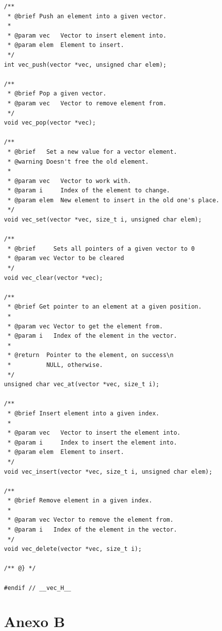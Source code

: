 \documentclass[11pt]{report}
\begin{document}
\begin{lstlisting}
/**
 * @brief Push an element into a given vector.
 *
 * @param vec   Vector to insert element into.
 * @param elem  Element to insert.
 */
int vec_push(vector *vec, unsigned char elem);

/**
 * @brief Pop a given vector.
 * @param vec   Vector to remove element from.
 */
void vec_pop(vector *vec);

/**
 * @brief   Set a new value for a vector element.
 * @warning Doesn't free the old element.
 *
 * @param vec   Vector to work with.
 * @param i     Index of the element to change.
 * @param elem  New element to insert in the old one's place.
 */
void vec_set(vector *vec, size_t i, unsigned char elem);

/**
 * @brief	  Sets all pointers of a given vector to 0
 * @param vec Vector to be cleared
 */
void vec_clear(vector *vec);

/**
 * @brief Get pointer to an element at a given position.
 *
 * @param vec Vector to get the element from.
 * @param i   Index of the element in the vector.
 *
 * @return  Pointer to the element, on success\n
 *          NULL, otherwise.
 */
unsigned char vec_at(vector *vec, size_t i);

/**
 * @brief Insert element into a given index.
 *
 * @param vec   Vector to insert the element into.
 * @param i     Index to insert the element into.
 * @param elem  Element to insert.
 */
void vec_insert(vector *vec, size_t i, unsigned char elem);

/**
 * @brief Remove element in a given index.
 *
 * @param vec Vector to remove the element from.
 * @param i   Index of the element in the vector.
 */
void vec_delete(vector *vec, size_t i);

/** @} */

#endif // __vec_H__
\end{lstlisting}

\chapter*{Anexo B}
\end{document}
